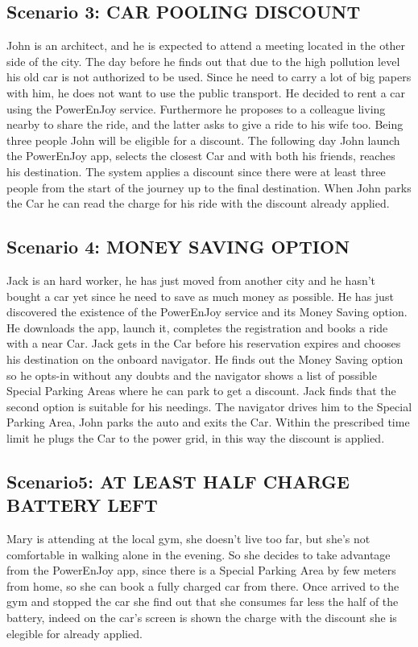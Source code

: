 \subsection{Scenario 3: CAR POOLING DISCOUNT}
John is an architect, and he is expected to attend a meeting located in the other side of the city. The day before he finds out that due to the high pollution level his old car is not authorized to be used. Since he need to carry a lot of big papers with him, he does not want to use the public transport. He decided to rent a car using the PowerEnJoy service. Furthermore he proposes to a colleague living nearby to share the ride, and the latter asks to give a ride to his wife too. Being three people John will be eligible for a discount. The following day John launch the PowerEnJoy app, selects the closest Car and with both his friends, reaches his destination. The system applies a discount since there were at least three people from the start of the journey up to the final destination. When John parks the Car he can read the charge for his ride with the discount already applied.
\subsection{Scenario 4: MONEY SAVING OPTION}
Jack is an hard worker, he has just moved from another city and he hasn't bought a car yet since he need to save as much money as possible. He has just discovered the existence of the PowerEnJoy service and its Money Saving option. He downloads the app, launch it, completes the registration and books a ride with a near Car. Jack gets in the Car before his reservation expires and chooses his destination on the onboard navigator. He finds out the Money Saving option so he opts-in without any doubts and the navigator shows a list of possible Special Parking Areas where he can park to get a discount. Jack finds that the second option is suitable for his needings. The navigator drives him to the Special Parking Area, John parks the auto and exits the Car. Within the prescribed time limit he plugs the Car to the power grid, in this way the discount is applied. 
\subsection{Scenario5: AT LEAST HALF CHARGE BATTERY LEFT}
Mary is attending at the local gym, she doesn't live too far, but she's not comfortable in walking alone in the evening. So she decides to take advantage from the PowerEnJoy app, since there is a Special Parking Area by few meters from home, so she can book a fully charged car from there. Once arrived to the gym and stopped the car she find out that she consumes far less the half of the battery, indeed on the car's screen is shown the charge with the discount she is elegible for already applied. %
